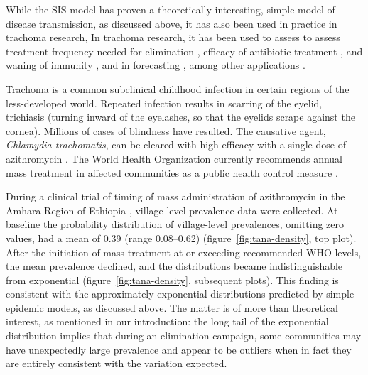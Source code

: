 \documentclass[review]{elsarticle}
\begin{document}
While the SIS model has proven a theoretically interesting,
simple model of disease transmission, as discussed above,
it has also been used in practice in trachoma research,
In trachoma research, it has been used to assess
to assess treatment frequency needed for elimination \cite{lietman-porco-dawson1999},
efficacy of antibiotic treatment \cite{liu-porco-mkocha2014},
and waning of immunity \cite{Liu2013}, and in forecasting \cite{liu-porco-amza2015},
among other applications
\cite{melese-chidambaram-alemayehu2004,Ray2007,Ray2009,Lietman2011,liu-porco-mkocha2014,liu-porco-amza2015b,Gao2016}.

Trachoma is a common subclinical childhood infection in
certain regions of the less-developed world.
Repeated infection results in scarring of the eyelid, trichiasis
(turning inward of the eyelashes, so that the eyelids scrape
against the cornea).
Millions of cases of blindness have resulted.
The causative agent, \emph{Chlamydia trachomatis},
can be cleared with high efficacy with a single dose of
azithromycin 
\cite{Schachter1999,Chidambaram2006}.
The World Health Organization currently recommends annual
mass treatment in affected communities as a public health
control measure
\cite{melese-chidambaram-alemayehu2004,solomon2006trachoma,Chidambaram2006,House2009}.

During a clinical trial of timing of mass administration
of azithromycin in the Amhara Region of Ethiopia
\cite{House2009,Stoller2011,Gebre2012},
village-level prevalence data were collected.
At baseline the probability distribution of village-level prevalences,
omitting zero values, had a mean of 0.39 (range 0.08--0.62)
(figure~\ref{fig:tana-density}, top plot).
After the initiation of mass treatment at or exceeding recommended
WHO levels, the mean prevalence declined, and the distributions
became indistinguishable from exponential
\cite{lietman-gebre-abdou2015}
(figure~\ref{fig:tana-density}, subsequent plots).
This finding is consistent with the approximately exponential distributions
predicted by simple epidemic models, as discussed above.
The matter is of more than theoretical interest, as mentioned in our
introduction: the long tail of
the exponential distribution implies that during an elimination
campaign, some communities may have unexpectedly large prevalence
and appear to be outliers when in fact they are entirely consistent
with the variation expected.
\end{document}
